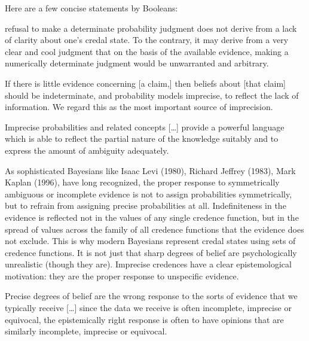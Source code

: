 \documentclass[11pt]{article}
\begin{document}
Here are a few concise statements by Booleans:

\begin{quotex}
  [A] refusal to make a determinate probability judgment does not
  derive from a lack of clarity about one's credal state. To the
  contrary, it may derive from a very clear and cool judgment that on
  the basis of the available evidence, making a numerically
  determinate judgment would be unwarranted and arbitrary.
\end{quotex}

\begin{quotex}
  If there is little evidence concerning [a claim,] then beliefs about
  [that claim] should be indeterminate, and probability models
  imprecise, to reflect the lack of information. We regard this as the
  most important source of imprecision. 
\end{quotex}

\begin{quotex}
  Imprecise probabilities and related concepts [{\ldots}] provide a
  powerful language which is able to reflect the partial nature of the
  knowledge suitably and to express the amount of ambiguity
  adequately. 
\end{quotex}

\begin{quotex}
  As sophisticated Bayesians like Isaac Levi (1980), Richard Jeffrey
  (1983), Mark Kaplan (1996), have long recognized, the proper
  response to symmetrically ambiguous or incomplete evidence is not to
  assign probabilities symmetrically, but to refrain from assigning
  precise probabilities at all. Indefiniteness in the evidence is
  reflected not in the values of any single credence function, but in
  the spread of values across the family of all credence functions
  that the evidence does not exclude. This is why modern Bayesians
  represent credal states using sets of credence functions. It is not
  just that sharp degrees of belief are psychologically unrealistic
  (though they are). Imprecise credences have a clear epistemological
  motivation: they are the proper response to unspecific evidence.
\end{quotex}

\begin{quotex}
  Precise degrees of belief are the wrong response to the sorts of
  evidence that we typically receive [{\ldots}] since the data we
  receive is often incomplete, imprecise or equivocal, the
  epistemically right response is often to have opinions that are
  similarly incomplete, imprecise or equivocal.
\end{quotex}
\end{document}
